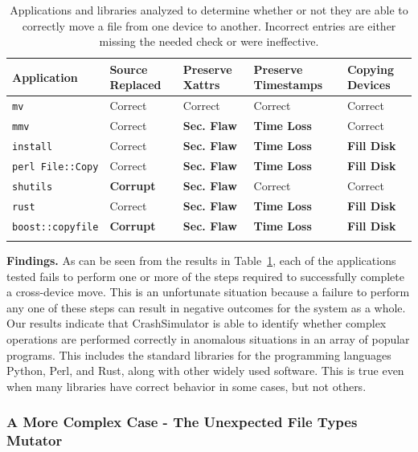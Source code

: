  \begin{table}[t]
    \scriptsize{}
    \begin{tabular}{l p{1cm} p{1cm} p{1.2cm} p{1cm}}
    \toprule{}
        Application     & Source Replaced & Preserve Xattrs & Preserve Timestamps & Copying Devices\\
\hline
        {\tt mv}              & Correct             & Correct         & Correct             & Correct\\
        {\tt mmv}             & Correct             & {\bf Sec. Flaw} & {\bf Time Loss} & Correct\\
        {\tt install}         & Correct             & {\bf Sec. Flaw} & {\bf Time Loss} & {\bf Fill Disk} \\
        {\tt perl File::Copy} & Correct             & {\bf Sec. Flaw} & {\bf Time Loss} & {\bf Fill Disk} \\
        {\tt shutils}         & {\bf Corrupt}	& {\bf Sec. Flaw} 	& Correct             & Correct\\
        {\tt rust}             & Correct             & {\bf Sec. Flaw} & {\bf Time Loss} & {\bf Fill Disk} \\
        {\tt boost::copyfile} & {\bf Corrupt}	      & {\bf Sec. Flaw} & {\bf Time Loss} & {\bf Fill Disk} \\
    \bottomrule{}
    \end{tabular}
    \caption{Applications and libraries analyzed to determine whether or not
      they are able to correctly move a file from one device to another.
Incorrect entries are either missing the needed check or were ineffective.}
    \label{table:crossdevice}
\end{table}

{\bf Findings.}
As can be seen from the results in Table~\ref{table:crossdevice}, each of the
applications tested fails to perform one or more of the steps required to
successfully complete a cross-device move.  This is an unfortunate situation
because a failure to perform any one of these steps can result in negative
outcomes for the system as a whole.
Our results indicate that CrashSimulator is able to identify whether complex
operations are performed correctly in anomalous situations in
an array of popular programs.
This includes the standard libraries for the programming languages Python,
Perl, and Rust, along with other widely used software.  This is true even
when many libraries have correct behavior in some cases, but not others.


\subsubsection{A More Complex Case - The Unexpected File Types Mutator}
\label{sec-file-type-bugs}

